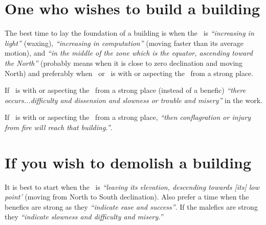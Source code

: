 \section{One who wishes to build a building}
The  best time to lay the foundation of a building is when the \Moon\, is \textsl{``increasing in light''} (waxing), \textsl{``increasing in computation''} (moving faster than its average motion), and \textsl{``in the middle of the zone which is the equator, ascending toward the North''} (probably means when it is close to zero declination and moving North) and preferably when \Jupiter\, or \Venus\, is with or aspecting the \Moon\, from a strong place.

If  \Saturn\, is with or aspecting the \Moon\, from a strong place (instead of a benefic) \textsl{``there occurs...difficulty and dissension and slowness or trouble and misery''} in the work.

If  \Mars\, is with or aspecting the \Moon\, from a strong place, \textsl{``then conflagration or injury from fire will reach that building.''}.

\section{If you wish to demolish a building}
It is best to start when the \Moon\, is \textsl{``leaving its elevation, descending towards [its] low point'} (moving from North to South declination). Also prefer a time when the benefics are strong as they \textsl{``indicate ease and success''}. If the malefics are strong they \textsl{``indicate slowness and difficulty and misery.''}